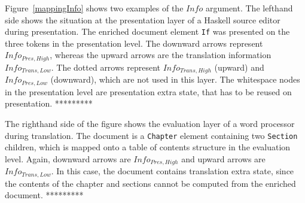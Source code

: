 Figure~\ref{mappingInfo} shows two examples of the $Info$ argument. The lefthand side shows the situation at the presentation layer of a Haskell source editor during presentation.  The enriched document element \verb|If|  was presented on the three tokens in the presentation level. The downward arrows represent $Info_{Pres,High}$, whereas the upward arrows are the translation information $Info_{Trans, Low}$. The dotted arrows represent $Info_{Trans,High}$ (upward) and $Info_{Pres,Low}$ (downward), which are not used in this layer. The whitespace nodes in the presentation level are presentation extra state, that has to be reused on presentation. 
*********

The righthand side of the figure shows the evaluation layer of a word processor during translation. The document is a \verb|Chapter| element containing two \verb|Section| children, which is mapped onto a table of contents structure in the evaluation level. Again, downward arrows are $Info_{Pres,High}$ and upward arrows are $Info_{Trans,Low}$.  In this case, the document contains translation extra state, since the contents of the chapter and sections cannot be computed from the enriched document. 
*********

